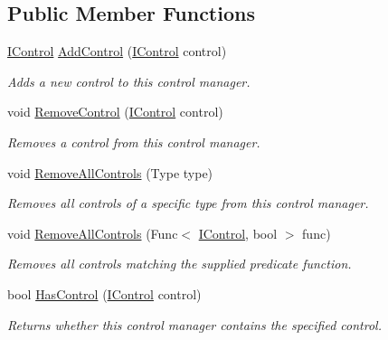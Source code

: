\subsection*{Public Member Functions}
\begin{DoxyCompactItemize}
\item 
\hyperlink{interface_tri_devs_1_1_tri_engine_1_1_u_i_1_1_i_control}{I\-Control} \hyperlink{interface_tri_devs_1_1_tri_engine_1_1_u_i_1_1_i_control_manager_a43ce1b3fc24b4658643b7910d0e97b3b}{Add\-Control} (\hyperlink{interface_tri_devs_1_1_tri_engine_1_1_u_i_1_1_i_control}{I\-Control} control)
\begin{DoxyCompactList}\small\item\em Adds a new control to this control manager. \end{DoxyCompactList}\item 
void \hyperlink{interface_tri_devs_1_1_tri_engine_1_1_u_i_1_1_i_control_manager_ae053582b5b5743a75ea1b9b48e760432}{Remove\-Control} (\hyperlink{interface_tri_devs_1_1_tri_engine_1_1_u_i_1_1_i_control}{I\-Control} control)
\begin{DoxyCompactList}\small\item\em Removes a control from this control manager. \end{DoxyCompactList}\item 
void \hyperlink{interface_tri_devs_1_1_tri_engine_1_1_u_i_1_1_i_control_manager_ae84c16c47a10cb7716092e5c85a73601}{Remove\-All\-Controls} (Type type)
\begin{DoxyCompactList}\small\item\em Removes all controls of a specific type from this control manager. \end{DoxyCompactList}\item 
void \hyperlink{interface_tri_devs_1_1_tri_engine_1_1_u_i_1_1_i_control_manager_a42746539c1ca6c93d7369583ee6551db}{Remove\-All\-Controls} (Func$<$ \hyperlink{interface_tri_devs_1_1_tri_engine_1_1_u_i_1_1_i_control}{I\-Control}, bool $>$ func)
\begin{DoxyCompactList}\small\item\em Removes all controls matching the supplied predicate function. \end{DoxyCompactList}\item 
bool \hyperlink{interface_tri_devs_1_1_tri_engine_1_1_u_i_1_1_i_control_manager_a3bad94b57fceb189939c30c5ad1f120c}{Has\-Control} (\hyperlink{interface_tri_devs_1_1_tri_engine_1_1_u_i_1_1_i_control}{I\-Control} control)
\begin{DoxyCompactList}\small\item\em Returns whether this control manager contains the specified control. \end{DoxyCompactList}\item 

\end{DoxyCompactItemize}
